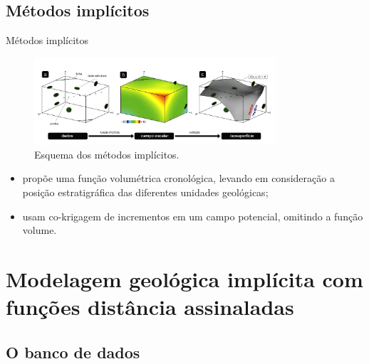 \documentclass[aspectratio=169]{beamer}
\begin{document}
\subsection{Métodos implícitos}

\begin{frame}{Métodos implícitos}
	\begin{figure}[H]
		\begin{center}
			\includegraphics[width=0.8\textwidth]{capitulo_1/implicit_modelig_pt_1}
			\caption{Esquema dos métodos implícitos.}
		\end{center}
	\end{figure}

\begin{itemize}
	\item \cite{mallet2004space} propõe uma função volumétrica cronológica, levando em consideração a posição estratigráfica das diferentes unidades geológicas;
	\item \cite{lajaunie1997foliation} usam co-krigagem de incrementos em um campo potencial, omitindo a função volume.
\end{itemize}

\end{frame}


\section{Modelagem geológica implícita com funções distância assinaladas}

\subsection{O banco de dados}
\end{document}
